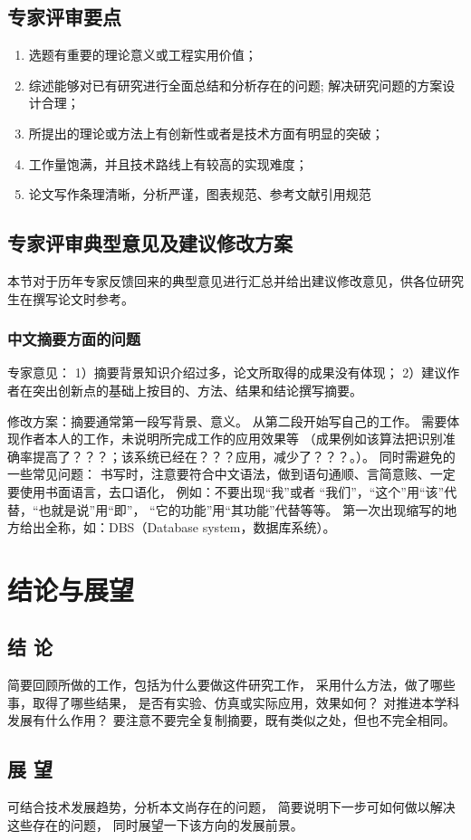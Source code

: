 \documentclass[12pt]{zjutthesis}
\begin{document}
\section{专家评审要点}
\begin{enumerate}
  \item 选题有重要的理论意义或工程实用价值；
  \item 综述能够对已有研究进行全面总结和分析存在的问题; 解决研究问题的方案设计合理；
  \item 所提出的理论或方法上有创新性或者是技术方面有明显的突破；
  \item 工作量饱满，并且技术路线上有较高的实现难度；
  \item 论文写作条理清晰，分析严谨，图表规范、参考文献引用规范
\end{enumerate}
\section{专家评审典型意见及建议修改方案}
本节对于历年专家反馈回来的典型意见进行汇总并给出建议修改意见，供各位研究生在撰写论文时参考。
\subsection{中文摘要方面的问题}
专家意见：
1）摘要背景知识介绍过多，论文所取得的成果没有体现；
2）建议作者在突出创新点的基础上按目的、方法、结果和结论撰写摘要。

修改方案：摘要通常第一段写背景、意义。
从第二段开始写自己的工作。
需要体现作者本人的工作，未说明所完成工作的应用效果等
（成果例如该算法把识别准确率提高了？？？；该系统已经在？？？应用，减少了？？？。）。
同时需避免的一些常见问题：
书写时，注意要符合中文语法，做到语句通顺、言简意赅、一定要使用书面语言，去口语化，
例如：不要出现“我”或者 “我们”，“这个”用“该”代替，“也就是说”用“即”，
“它的功能”用“其功能”代替等等。
第一次出现缩写的地方给出全称，如：DBS（Database system，数据库系统）。

\chapter{结论与展望}
\section{结  论}
\linespread{1.5}
简要回顾所做的工作，包括为什么要做这件研究工作，
采用什么方法，做了哪些事，取得了哪些结果，
是否有实验、仿真或实际应用，效果如何？
对推进本学科发展有什么作用？
要注意不要完全复制摘要，既有类似之处，但也不完全相同。
\section{展  望}
可结合技术发展趋势，分析本文尚存在的问题，
简要说明下一步可如何做以解决这些存在的问题，
同时展望一下该方向的发展前景。
\end{document}

